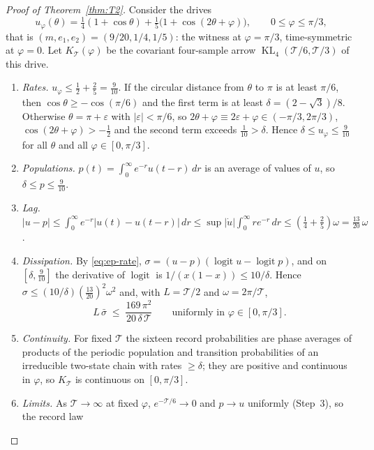 \documentclass[10pt]{article}
\theoremstyle{definition}
\DeclareMathOperator{\KL}{KL}
\newcommand{\per}{\mathcal T}
\newcommand{\sbar}{\bar\sigma}
\begin{document}
\begin{proof}[Proof of Theorem~\ref{thm:T2}]
Consider the drives
\[
u_\varphi(\theta)=\tfrac14(1+\cos\theta)+\tfrac15\bigl(1+\cos(2\theta+\varphi)\bigr),
\qquad 0\leq\varphi\leq\pi/3,
\]
that is $(m,e_1,e_2)=(9/20,1/4,1/5)$: the witness at
$\varphi=\pi/3$, time-symmetric at $\varphi=0$.  Let $K_\per(\varphi)$ be
the covariant four-sample arrow $\KL_4(\per/6,\per/3)$ of this drive.

\begin{enumerate}[label=\textbf{Step \arabic*.},leftmargin=*,nosep]
\item \emph{Rates.}  $u_\varphi\leq\frac12+\frac25=\frac9{10}$.  If the
  circular distance from $\theta$ to $\pi$ is at least $\pi/6$, then
  $\cos\theta\geq-\cos(\pi/6)$ and the first term is at least
  $\delta=(2-\sqrt3)/8$.  Otherwise $\theta=\pi+\varepsilon$ with
  $|\varepsilon|<\pi/6$, so $2\theta+\varphi\equiv2\varepsilon+\varphi\in
  (-\pi/3,2\pi/3)$, $\cos(2\theta+\varphi)>-\frac12$ and the second term
  exceeds $\frac1{10}>\delta$.  Hence $\delta\leq u_\varphi\leq\frac9{10}$
  for all $\theta$ and all $\varphi\in[0,\pi/3]$.
\item \emph{Populations.}  $p(t)=\int_0^\infty e^{-r}u(t-r)\,dr$ is an
  average of values of $u$, so $\delta\leq p\leq\frac9{10}$.
\item \emph{Lag.}  $|u-p|\leq\int_0^\infty e^{-r}|u(t)-u(t-r)|\,dr\leq
  \sup|\dot u|\int_0^\infty re^{-r}\,dr\leq(\frac14+\frac25)\omega
  =\frac{13}{20}\,\omega$.
\item \emph{Dissipation.}  By \eqref{eq:ep-rate},
  $\sigma=(u-p)(\operatorname{logit}u-\operatorname{logit}p)$, and on
  $[\delta,\frac9{10}]$ the derivative of $\operatorname{logit}$ is
  $1/(x(1-x))\leq10/\delta$.  Hence $\sigma\leq(10/\delta)(\frac{13}{20})^2\omega^2$
  and, with $L=\per/2$ and $\omega=2\pi/\per$,
  \begin{equation}
  \label{eq:uniform-ep}
  L\,\sbar\;\leq\;\frac{169\,\pi^2}{20\,\delta\,\per}
  \qquad\text{uniformly in }\varphi\in[0,\pi/3].
  \end{equation}
\item \emph{Continuity.}  For fixed $\per$ the sixteen record
  probabilities are phase averages of products of the periodic population
  and transition probabilities of an irreducible two-state chain with
  rates $\geq\delta$; they are positive and continuous in $\varphi$, so
  $K_\per$ is continuous on $[0,\pi/3]$.
\item \emph{Limits.}  As $\per\to\infty$ at fixed $\varphi$,
  $e^{-\per/6}\to0$ and $p\to u$ uniformly (Step~3), so the record law

\end{enumerate}
\end{proof}
\end{document}
